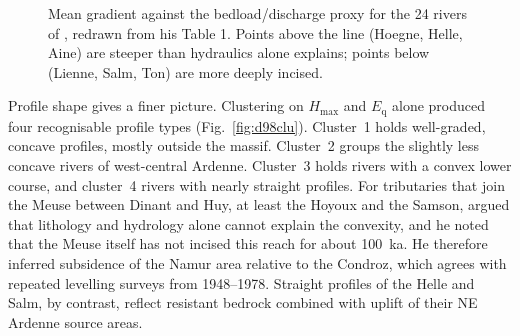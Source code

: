 \documentclass[10pt,a4paper,twocolumn]{article}
\newcommand{\permil}{\textperthousand}
\newcommand{\Hvm}{\ensuremath{H_\mathrm{vm}}}
\begin{document}
\begin{figure}[t]
\centering
{}
\caption{Mean gradient against the bedload/discharge proxy for the 24 rivers of
\citet{Demoulin1998}, redrawn from his Table 1. Points above the line (Hoegne, Helle, Aine) are steeper
than hydraulics alone explains; points below (Lienne, Salm, Ton) are more deeply incised.}
\label{fig:d98reg}
\end{figure}

Profile shape gives a finer picture. Clustering on $H_\mathrm{max}$ and $E_\mathrm{q}$ alone produced four
recognisable profile types (Fig.~\ref{fig:d98clu}). Cluster~1 holds well-graded, concave profiles,
mostly outside the massif. Cluster~2 groups the slightly less concave rivers of west-central Ardenne.
Cluster~3 holds rivers with a convex lower course, and cluster~4 rivers with nearly straight profiles.
For tributaries that join the Meuse between Dinant and Huy, at least the Hoyoux and the Samson,
\citet{Demoulin1998} argued that lithology and hydrology alone cannot explain the convexity, and he
noted that the Meuse itself has not incised this reach for about 100~ka.
He therefore inferred subsidence of the Namur area relative to the Condroz, which
agrees with repeated levelling surveys from 1948--1978. Straight profiles of the Helle and Salm, by
contrast, reflect resistant bedrock combined with uplift of their NE Ardenne source areas.
\end{document}

